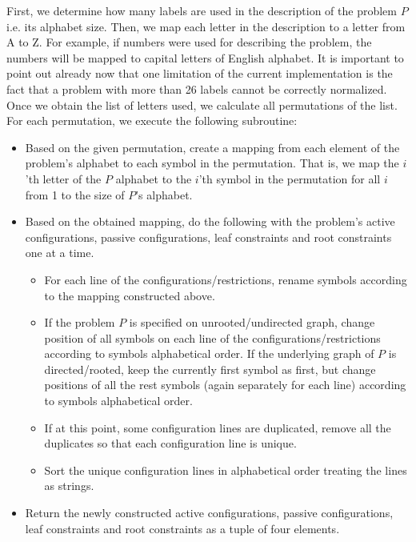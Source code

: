 First, we determine how many labels are used in the description of the
problem $P$ i.e. its alphabet size. Then, we map each letter in the description
to a letter from A to Z. For example, if numbers were used for describing
the problem, the numbers will be mapped to capital letters of
English alphabet. It is important to point out already now that
one limitation of the current implementation is the fact that
a problem with more than 26 labels cannot be correctly normalized.
Once we obtain the list of letters used, we calculate all
permutations of the list. For each permutation, we execute the following
subroutine:

\begin{itemize}
  \item Based on the given permutation, create a mapping from each
  element of the problem's alphabet to each symbol in the permutation.
  That is, we map the $i$'th letter of the $P$ alphabet to the $i$'th symbol
  in the permutation for all $i$ from 1 to the size of $P$'s alphabet.
  \item Based on the obtained mapping, do the following with the problem's
  active configurations, passive configurations, leaf constraints and
  root constraints one at a time.
  
  \begin{itemize}
    \item For each line of the configurations/restrictions, rename symbols
    according to the mapping constructed above.
    \item If the problem $P$ is specified on unrooted/undirected graph,
    change position of all symbols on each line of the configurations/restrictions according to symbols alphabetical order.
    If the underlying graph of $P$ is directed/rooted, keep the currently first
    symbol as first, but change positions of all the rest symbols (again separately for each line)
    according to symbols alphabetical order.
    \item If at this point, some configuration lines are
    duplicated, remove all the duplicates so that each configuration
    line is unique.
    \item Sort the unique configuration lines in alphabetical order
    treating the lines as strings.
  \end{itemize}

  \item Return the newly constructed active configurations,
  passive configurations, leaf constraints and root constraints as
  a tuple of four elements.
\end{itemize}

